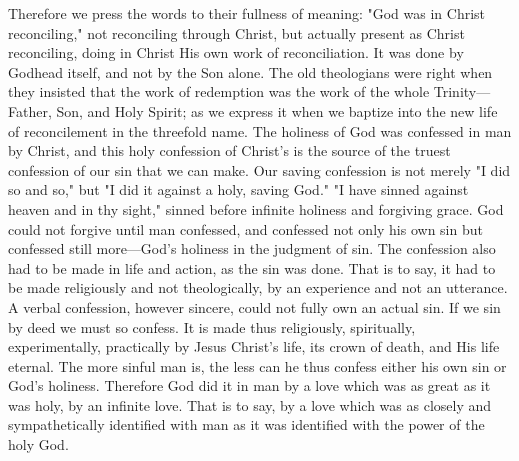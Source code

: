 \documentclass[draft]{ptfdoc}
\begin{document}
Therefore we press the words to their fullness 
of meaning: "God was in Christ reconciling," 
not reconciling through Christ, but actually 
present as Christ reconciling, doing in Christ 
His own work of reconciliation. It was done by 
Godhead itself, and not by the Son alone. The 
old theologians were right when they insisted 
that the work of redemption was the work of 
the whole Trinity---Father, Son, and Holy 
Spirit; as we express it when we baptize into 
the new life of reconcilement in the threefold 
name. The holiness of God was confessed in 
man by Christ, and this holy confession of 
Christ's is the source of the truest confession of 
our sin that we can make. Our saving confession 
is not merely "I did so and so," but "I did 
it against a holy, saving God." "I have sinned 
against heaven and in thy sight," sinned before 
infinite holiness and forgiving grace. God could 
not forgive until man confessed, and confessed 
not only his own sin but confessed still more---God's 
holiness in the judgment of sin. The 
confession also had to be made in life and action, 
as the sin was done. That is to say, it had to be 
made religiously and not theologically, by an 
experience and not an utterance. A verbal 
confession, however sincere, could not fully own 
an actual sin. If we sin by deed we must so 
confess. It is made thus religiously, spiritually, 
experimentally, practically by Jesus Christ's 
life, its crown of death, and His life eternal. 
The more sinful man is, the less can he thus 
confess either his own sin or God's holiness. 
Therefore God did it in man by a love which 
was as great as it was holy, by an infinite love. 
That is to say, by a love which was as closely 
and sympathetically identified with man as it 
was identified with the power of the holy God. 
\end{document}
